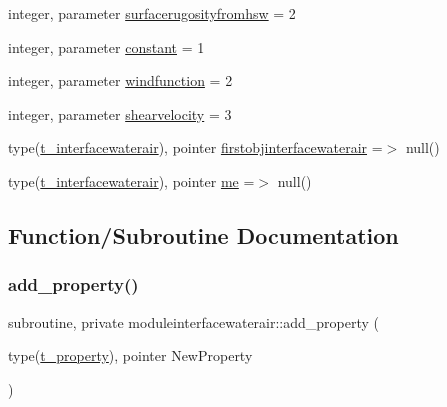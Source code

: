 \begin{DoxyCompactItemize}
\item 
integer, parameter \mbox{\hyperlink{namespacemoduleinterfacewaterair_a1a742a8ff8b7f163b4dc4673bdf8482f}{surfacerugosityfromhsw}} = 2
\item 
integer, parameter \mbox{\hyperlink{namespacemoduleinterfacewaterair_af9a5813643af305d2fcb128710906ce2}{constant}} = 1
\item 
integer, parameter \mbox{\hyperlink{namespacemoduleinterfacewaterair_ab0bf8dbd48fafcd7c122816cd5ebce18}{windfunction}} = 2
\item 
integer, parameter \mbox{\hyperlink{namespacemoduleinterfacewaterair_afc5639ec5cd09597dc78cfe2ee596fd0}{shearvelocity}} = 3
\item 
type(\mbox{\hyperlink{structmoduleinterfacewaterair_1_1t__interfacewaterair}{t\+\_\+interfacewaterair}}), pointer \mbox{\hyperlink{namespacemoduleinterfacewaterair_a55db38560ef3abcb02cfd5a7c17dc800}{firstobjinterfacewaterair}} =$>$ null()
\item 
type(\mbox{\hyperlink{structmoduleinterfacewaterair_1_1t__interfacewaterair}{t\+\_\+interfacewaterair}}), pointer \mbox{\hyperlink{namespacemoduleinterfacewaterair_afff814b0fb4c5feeb5a9e6278d4f6fb5}{me}} =$>$ null()
\end{DoxyCompactItemize}


\subsection{Function/\+Subroutine Documentation}
\mbox{\label{namespacemoduleinterfacewaterair_a2a801625d49cd1732858f2dc52a71271}} 
\subsubsection{\texorpdfstring{add\+\_\+property()}{add\_property()}}
{\footnotesize\ttfamily subroutine, private moduleinterfacewaterair\+::add\+\_\+property (\begin{DoxyParamCaption}\item[{type(\mbox{\hyperlink{structmoduleinterfacewaterair_1_1t__property}{t\+\_\+property}}), pointer}]{New\+Property }\end{DoxyParamCaption})\hspace{0.3cm}{\ttfamily [private]}}

